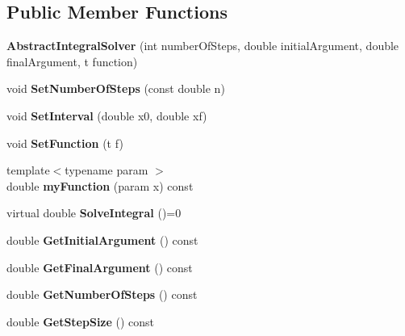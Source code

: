 \subsection*{Public Member Functions}
\begin{DoxyCompactItemize}
\item 
\mbox{\label{class_abstract_integral_solver_a44d64706b428c7b0bd4c9779c4d32b6f}} 
{\bfseries Abstract\+Integral\+Solver} (int number\+Of\+Steps, double initial\+Argument, double final\+Argument, t function)
\item 
\mbox{\label{class_abstract_integral_solver_ab74cb9894daf3bcc97e14158a6087d99}} 
void {\bfseries Set\+Number\+Of\+Steps} (const double n)
\item 
\mbox{\label{class_abstract_integral_solver_a891baae0103a8b488cf6cd007c109844}} 
void {\bfseries Set\+Interval} (double x0, double xf)
\item 
\mbox{\label{class_abstract_integral_solver_adfb6eb8d70ebaf103e25ce468ac38b40}} 
void {\bfseries Set\+Function} (t f)
\item 
\mbox{\label{class_abstract_integral_solver_a094212bdcdd007d75586495ff838f436}} 
{\footnotesize template$<$typename param $>$ }\\double {\bfseries my\+Function} (param x) const
\item 
\mbox{\label{class_abstract_integral_solver_ad87cb44c5ef3122bc95be48f473ba399}} 
virtual double {\bfseries Solve\+Integral} ()=0
\item 
\mbox{\label{class_abstract_integral_solver_adb8ef30d8231a173ee85e91155829daa}} 
double {\bfseries Get\+Initial\+Argument} () const
\item 
\mbox{\label{class_abstract_integral_solver_a30f25ec2dff6d5881875952bec1d1774}} 
double {\bfseries Get\+Final\+Argument} () const
\item 
\mbox{\label{class_abstract_integral_solver_a90148ecbeb6396638c428a319a7031dd}} 
double {\bfseries Get\+Number\+Of\+Steps} () const
\item 
\mbox{\label{class_abstract_integral_solver_a0220c77810a813699748b875627da1a7}} 
double {\bfseries Get\+Step\+Size} () const
\end{DoxyCompactItemize}
